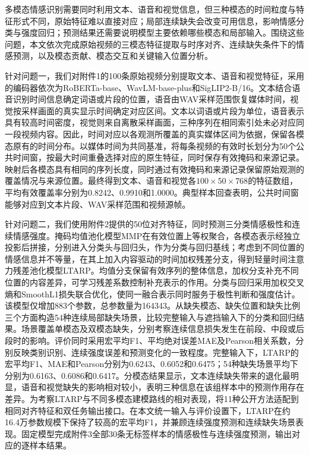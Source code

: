 \noindent\hspace*{2em}多模态情感识别需要同时利用文本、语音和视觉信息，但三种模态的时间粒度与特征形式不同，原始特征难以直接对应；局部连续缺失会改变可用信息，影响情感分类与强度回归；预测结果还需要说明模型主要依赖哪些模态和局部输入。围绕这些问题，本文依次完成原始视频的三模态特征提取与时序对齐、连续缺失条件下的情感预测，以及模态贡献、模态交互和关键输入位置分析。

针对问题一，我们对附件1的100条原始视频分别提取文本、语音和视觉特征，采用的编码器依次为RoBERTa-base、WavLM-base-plus和SigLIP2-B/16。文本结合语音识别时间信息确定词语或片段的位置，语音由WAV采样范围恢复媒体时间，视觉按采样画面的真实显示时间确定对应区间。文本以词语或片段为单位，语音表示具有较高时间密度，视觉则来自离散采样画面，三种序列在相同索引处未必对应同一段视频内容。因此，时间对应以各观测所覆盖的真实媒体区间为依据，保留各模态原有的时间分布。以媒体时间为共同基准，将每条视频的有效时长划分为50个公共时间窗，按最大时间重叠选择对应的原生特征，同时保存有效掩码和来源记录。映射后各模态具有相同的序列长度，同时通过有效掩码和来源记录保留原始观测的覆盖情况与来源位置。最终得到文本、语音和视觉各$100\times50\times768$的特征数组，平均有效覆盖率分别为0.8242、0.9910和1.0000。典型样本回查表明，公共时间窗能够对应到文本片段、WAV采样范围和视频源帧。

针对问题二，我们使用附件2提供的50位对齐特征，同时预测三分类情感极性和连续情感强度。掩码均值池化模型MMP在有效位置上等权聚合，各模态表示经独立投影后拼接，分别进入分类头与回归头，作为分类与回归基线；考虑到不同位置的情感信息并不等量，在其上加入内容驱动的时间加权残差分支，得到轻量时间注意力残差池化模型LTARP。均值分支保留有效序列的整体信息，加权分支补充不同位置的内容差异，可学习残差系数控制补充表示的作用。分类与回归采用加权交叉熵和SmoothL1损失联合优化，使同一融合表示同时服务于极性判断和强度估计。该模型仅增加883个参数，总参数量为164343。从缺失模态、缺失位置和缺失比例三个方面构造54种连续局部缺失场景，比较完整输入与遮挡输入下的分类和回归结果。场景覆盖单模态及双模态缺失，分别考察连续信息损失发生在前段、中段或后段时的影响。评价同时采用宏平均F1、平均绝对误差MAE及Pearson相关系数，分别反映类别识别、连续强度误差和预测变化的一致程度。完整输入下，LTARP的宏平均F1、MAE和Pearson分别为0.6243、0.6052和0.6475；54种缺失场景平均下分别为0.6163、0.6086和0.6417。分模态结果显示，文本连续缺失带来的退化最明显，语音和视觉缺失的影响相对较小，表明三种信息在该组样本中的预测作用存在差异。为考察LTARP与不同多模态建模路线的相对表现，将11种公开方法适配到相同对齐特征和双任务输出接口。在本文统一输入与评价设置下，LTARP在约16.4万参数规模下保持了较高的宏平均F1，并兼顾连续强度预测和连续缺失场景表现。固定模型完成附件3全部30条无标签样本的情感极性与连续强度预测，输出对应的逐样本结果。

